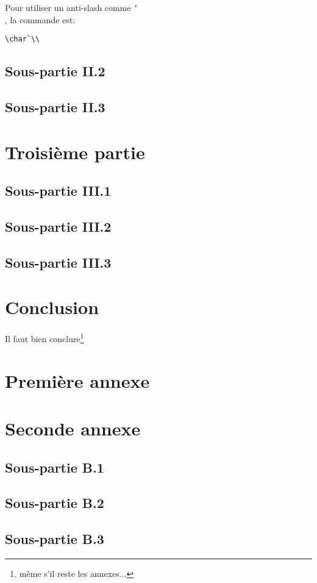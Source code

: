 \documentclass[a4paper,10pt]{article}
\newcommand{\bksl}{\char`\\} %
\begin{document}
Pour utiliser un anti-slash comme \texttt{\bksl}, la commande est:
\begin{verbatim}
\char`\\
\end{verbatim}

\subsection{Sous-partie II.2}
\subsection{Sous-partie II.3}

\clearpage
\section{Troisième partie}
\subsection{Sous-partie III.1}
\subsection{Sous-partie III.2}
\subsection{Sous-partie III.3}

\clearpage
\section{Conclusion}

Il faut bien conclure\footnote{même s'il reste les annexes...}

\clearpage
\begin{appendices}
\section{Première annexe}
\label{appendiceA}

\section{Seconde annexe}
\label{appendiceB}

\subsection{Sous-partie B.1}
\subsection{Sous-partie B.2}
\subsection{Sous-partie B.3}

\end{appendices}
\end{document}
